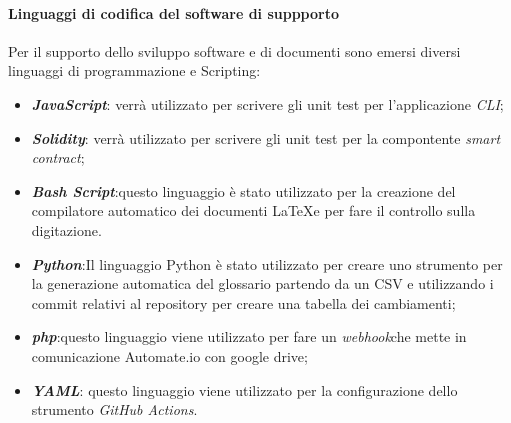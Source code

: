 \paragraph{Linguaggi di codifica del software di suppporto}
Per il supporto dello sviluppo software e di documenti sono emersi diversi linguaggi
di programmazione e Scripting:
 \begin{itemize}
   \item \textbf{\textit{JavaScript\glos}}: verrà utilizzato per scrivere gli unit test per l'applicazione \textit{CLI}\glos;
   \item \textbf{\textit{Solidity\glos}}: verrà utilizzato per scrivere gli unit test per la compontente \textit{smart contract}\glos;
   \item \textbf{\textit{Bash Script\glos}}:questo linguaggio è stato utilizzato per la creazione del compilatore automatico
   dei documenti \LaTeX e per fare il controllo sulla digitazione.
   \item \textbf{\textit{Python\glos}}:Il linguaggio Python è stato utilizzato per creare uno strumento per la generazione
   automatica del glossario partendo da un CSV e utilizzando i commit relativi
   al repository per creare una tabella dei cambiamenti;
   \item \textbf{\textit{php\glos}}:questo linguaggio viene utilizzato per  fare
   un \textit{webhook}\glo che mette in comunicazione Automate.io con google drive;
   \item \textbf{\textit{YAML\glos}}: questo linguaggio viene utilizzato per la configurazione dello strumento \textit{GitHub Actions\glos}.
 \end{itemize}

